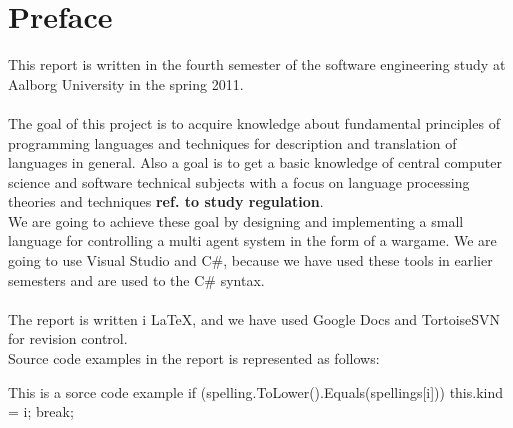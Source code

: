 \chapter*{Preface}
This report is written in the fourth semester of the software engineering study at Aalborg University in the spring 2011.
\\
\\
The goal of this project is to acquire knowledge about fundamental principles of programming languages and techniques for description and translation of languages in general. Also a goal is to get a basic knowledge of central computer science and software technical subjects with a focus on language processing theories and techniques \textbf{ref. to study regulation}.\\
  We are going to achieve these goal by designing and implementing a small language for controlling a multi agent system in the form of a wargame. We are going to use Visual Studio and C\#, because we have used these tools in earlier semesters and are used to the C\# syntax.
	\\
	\\
	The report is written i \LaTeX, and we have used Google Docs and TortoiseSVN for revision control.
	\\

Source code examples in the report is represented as follows:
\begin{source}{This is a sorce code example}{}
if (spelling.ToLower().Equals(spellings[i]))
	{
		this.kind = i;
		break;
	}
\end{source}
